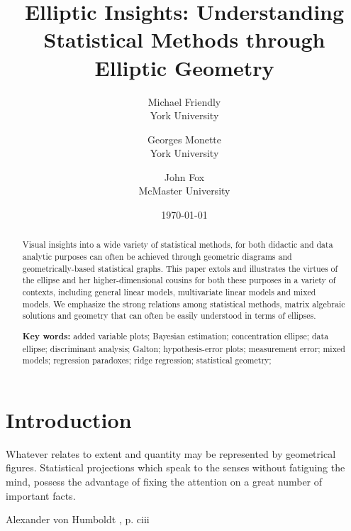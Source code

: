 \documentclass[11pt]{article}%
\newcommand{\keywords}[1]{\par\noindent\textbf{Key words:} #1}
\begin{document}
\begin{titlepage}
\title{Elliptic Insights: Understanding Statistical Methods through Elliptic Geometry}

\author{Michael Friendly%
 \\ York University
\and
Georges Monette \\ York University
\and
John Fox \\ McMaster University
}
\date{\today}
\end{titlepage}
\maketitle

\begin{abstract}
Visual insights into  a wide variety  of statistical methods,  for both didactic
and data analytic purposes can often be achieved through geometric diagrams  and
geometrically-based statistical graphs.  This  paper extols and illustrates  the
virtues  of  the  ellipse  and her  higher-dimensional  cousins  for  both these
purposes in a variety of contexts, including general linear models, multivariate
linear models and mixed models. 
We emphasize the strong relations among statistical methods, matrix algebraic
solutions and geometry that can often be easily understood in terms of
ellipses.

\keywords{
added variable plots; 
Bayesian estimation;
concentration ellipse; 
data ellipse; 
discriminant analysis;
Galton; 
hypothesis-error plots;
measurement error;
mixed models;
regression paradoxes;
ridge regression; 
statistical geometry; 
}
\end{abstract}

\section{Introduction}

\epigraph{Whatever relates to extent and quantity may be represented by
geometrical figures. Statistical projections which speak to the senses without
fatiguing the mind, possess the advantage of fixing the attention on a great
number of important facts.}{Alexander von Humboldt \citeyearpar{Humboldt:1811a}, p. ciii}
\end{document}
